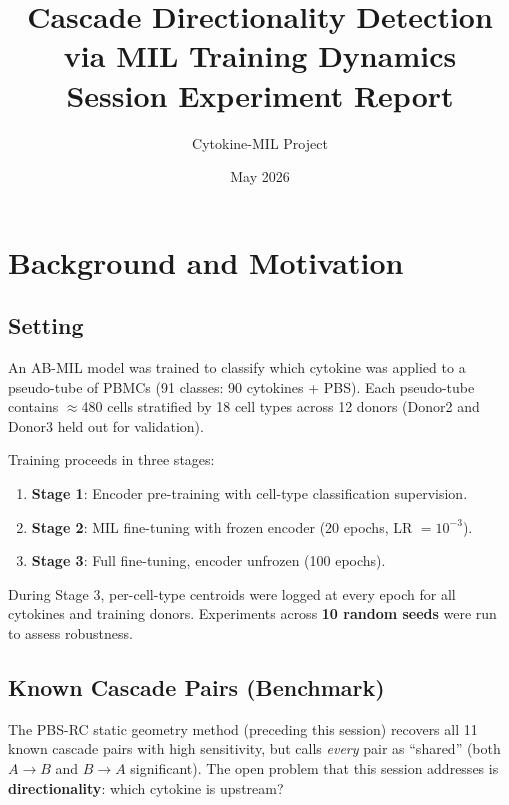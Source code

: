 \documentclass[11pt,a4paper]{article}
\title{
    \textbf{Cascade Directionality Detection via MIL Training Dynamics}\\[0.5em]
    \large Session Experiment Report
}
\author{Cytokine-MIL Project}
\date{May 2026}
\begin{document}
\maketitle
\tableofcontents
\newpage

\section{Background and Motivation}

\subsection{Setting}

An AB-MIL model was trained to classify which cytokine was applied to a
pseudo-tube of PBMCs (91 classes: 90 cytokines + PBS). Each pseudo-tube
contains $\approx$480 cells stratified by 18 cell types across 12 donors
(Donor2 and Donor3 held out for validation).

Training proceeds in three stages:
\begin{enumerate}[noitemsep]
    \item \textbf{Stage 1}: Encoder pre-training with cell-type classification supervision.
    \item \textbf{Stage 2}: MIL fine-tuning with frozen encoder (20 epochs, LR $= 10^{-3}$).
    \item \textbf{Stage 3}: Full fine-tuning, encoder unfrozen (100 epochs).
\end{enumerate}
During Stage 3, per-cell-type centroids were logged at every epoch for all
cytokines and training donors. Experiments across \textbf{10 random seeds} were
run to assess robustness.

\subsection{Known Cascade Pairs (Benchmark)}

The PBS-RC static geometry method (preceding this session) recovers all 11 known
cascade pairs with high sensitivity, but calls \emph{every} pair as
``shared'' (both $A \to B$ and $B \to A$ significant). The open problem that
this session addresses is \textbf{directionality}: which cytokine is upstream?
\end{document}
